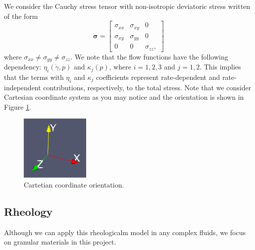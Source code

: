 \par 
We consider the Cauchy stress tensor with non-isotropic deviatoric stress written of the form 
\[{\bm \sigma} = 
  \begin{bmatrix}
    \sigma_{xx} & \sigma_{xy} & 0 
    \\
    \sigma_{xy} & \sigma_{yy} & 0 
    \\
    0 & 0 & \sigma_{zz},
  \end{bmatrix}
\] 
where $\sigma_{xx} \neq \sigma_{yy} \neq \sigma_{zz}$.
We note that the flow functions have the following dependency: $\eta_i(\dot{\gamma}, p)$ and $\kappa_j (p)$, where $i = 1,2,3$ and $j = 1,2$. 
This implies that the terms with $\eta_i$ and $\kappa_j$ coefficients represent rate-dependent and rate-independent contributions, respectively, to the total stress.
%
Note that we consider Cartesian coordinate system as you may notice and the orientation is shown in Figure \ref{fig_orientation}.
\\
\vphantom{dX}
    \begin{figure}[ht]
      \begin{center}
        \includegraphics[scale=0.8]{figures/fig_orientation.png}
      \caption{Cartetian coordinate orientation.}
      \label{fig_orientation}
      \end{center}
    \end{figure}
\subsection{Rheology}
Although we can apply this rheologicalm model in any complex fluids, we focus on granular materials in this project. 

